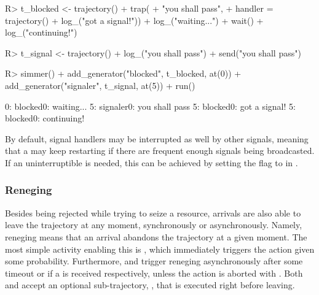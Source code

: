 \documentclass[
  nojss]{jss}
\begin{document}
\begin{CodeChunk}
\begin{CodeInput}
R> t_blocked <- trajectory() %
+   trap(
+     "you shall pass",
+     handler = trajectory() %
+       log_("got a signal!")) %
+   log_("waiting...") %
+   wait() %
+   log_("continuing!")
\end{CodeInput}
\end{CodeChunk}

\begin{CodeChunk}
\begin{CodeInput}
R> t_signal <- trajectory() %
+   log_("you shall pass") %
+   send("you shall pass")
\end{CodeInput}
\end{CodeChunk}

\begin{CodeChunk}
\begin{CodeInput}
R> simmer() %
+   add_generator("blocked", t_blocked, at(0)) %
+   add_generator("signaler", t_signal, at(5)) %
+   run() %
\end{CodeInput}
\begin{CodeOutput}
0: blocked0: waiting...
5: signaler0: you shall pass
5: blocked0: got a signal!
5: blocked0: continuing!
\end{CodeOutput}
\end{CodeChunk}

By default, signal handlers may be interrupted as well by other signals,
meaning that a  may keep restarting if there are frequent
enough signals being broadcasted. If an uninterruptible 
is needed, this can be achieved by setting the flag 
to  in .

\hypertarget{reneging}{%
\subsubsection{Reneging}\label{reneging}}

Besides being rejected while trying to seize a resource, arrivals are
also able to leave the trajectory at any moment, synchronously or
asynchronously. Namely, reneging means that an arrival abandons the
trajectory at a given moment. The most simple activity enabling this is
, which immediately triggers the action given some
probability. Furthermore,  and 
trigger reneging asynchronously after some timeout  or if a
 is received respectively, unless the action is aborted
with . Both  and
 accept an optional sub-trajectory, , that
is executed right before leaving.
\end{document}
